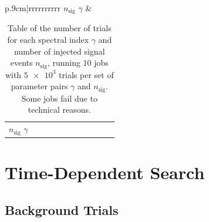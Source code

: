 \begin{table}
  \caption{Table of the number of trials for each spectral index $\gamma$ and number of injected signal events $n_\text{sig}$, running $\num{10}$ jobs with $\num{5e3}$ trials per set of parameter pairs $\gamma$ and $n_\text{sig}$. Some jobs fail due to technical reasons.}
  \label{tab:trials_sig_time_int_table}
  \begin{subtable}{\linewidth}
  \centering
  \begin{tabular}{p{.9cm}|rrrrrrrrrr}
    \toprule
    \: $n_\text{sig}$ \newline $\gamma$ \: & 
    \toprule
    
    \toprule
  \end{tabular}
\end{subtable}
\begin{subtable}{\linewidth}
\centering
  \begin{tabular}{p{.9cm}|rrrrrrrrrr}
    \toprule
    \: $n_\text{sig}$ \newline $\gamma$ \: & 
    \toprule
    
    \toprule
  \end{tabular}
  \end{subtable}
\end{table}

\section{Time-Dependent Search}

\subsection{Background Trials}

